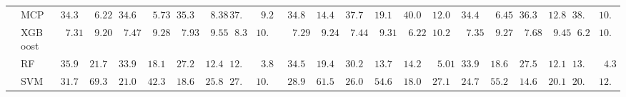 \documentclass{article}
\begin{document}
\begin{tabular}{ll|ll|llllll|llllll|llllll}
 & MCP  & $\phantom{0}34.36$ & $\phantom{00}6.22$ & $\phantom{0}34.62$ & $\phantom{00}5.73$ & $\phantom{0}35.30$ & $\phantom{00}8.38$ & $37.89$ & $\phantom{0}9.25$ & $\phantom{0}34.89$ & $\phantom{0}14.44$ & $\phantom{0}37.79$ & $\phantom{0}19.13$ & $\phantom{0}40.09$ & $\phantom{0}12.09$ & $\phantom{0}34.44$ & $\phantom{00}6.45$ & $\phantom{0}36.34$ & $\phantom{0}12.84$ & $38.61$ & $10.46$ \\
 & XGBoost  & $\phantom{00}7.31$ & $\phantom{00}9.20$ & $\phantom{00}7.47$ & $\phantom{00}9.28$ & $\phantom{00}7.93$ & $\phantom{00}9.55$ & $\phantom{0}8.31$ & $10.94$ & $\phantom{00}7.29$ & $\phantom{00}9.24$ & $\phantom{00}7.44$ & $\phantom{00}9.31$ & $\phantom{00}6.22$ & $\phantom{0}10.27$ & $\phantom{00}7.35$ & $\phantom{00}9.27$ & $\phantom{00}7.68$ & $\phantom{00}9.45$ & $\phantom{0}6.21$ & $10.32$ \\
 & RF  & $\phantom{0}35.98$ & $\phantom{0}21.75$ & $\phantom{0}33.96$ & $\phantom{0}18.16$ & $\phantom{0}27.21$ & $\phantom{0}12.43$ & $12.73$ & $\phantom{0}3.83$ & $\phantom{0}34.56$ & $\phantom{0}19.41$ & $\phantom{0}30.28$ & $\phantom{0}13.70$ & $\phantom{0}14.24$ & $\phantom{00}5.01$ & $\phantom{0}33.99$ & $\phantom{0}18.69$ & $\phantom{0}27.51$ & $\phantom{0}12.17$ & $13.53$ & $\phantom{0}4.31$ \\
 & SVM  & $\phantom{0}31.70$ & $\phantom{0}69.31$ & $\phantom{0}21.06$ & $\phantom{0}42.36$ & $\phantom{0}18.66$ & $\phantom{0}25.86$ & $27.20$ & $10.69$ & $\phantom{0}28.98$ & $\phantom{0}61.59$ & $\phantom{0}26.08$ & $\phantom{0}54.60$ & $\phantom{0}18.09$ & $\phantom{0}27.13$ & $\phantom{0}24.74$ & $\phantom{0}55.21$ & $\phantom{0}14.65$ & $\phantom{0}20.11$ & $20.13$ & $12.69$ \\
\hline 
\end{tabular}
\end{document}

